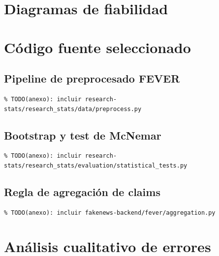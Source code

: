 \documentclass[12pt,a4paper,oneside]{report}
\begin{document}
\chapter{Diagramas de fiabilidad}


\chapter{Código fuente seleccionado}

\section{Pipeline de preprocesado FEVER}

\begin{verbatim}
% TODO(anexo): incluir research-stats/research_stats/data/preprocess.py
\end{verbatim}

\section{Bootstrap y test de McNemar}

\begin{verbatim}
% TODO(anexo): incluir research-stats/research_stats/evaluation/statistical_tests.py
\end{verbatim}

\section{Regla de agregación de claims}

\begin{verbatim}
% TODO(anexo): incluir fakenews-backend/fever/aggregation.py
\end{verbatim}

\chapter{Análisis cualitativo de errores}

\end{document}
